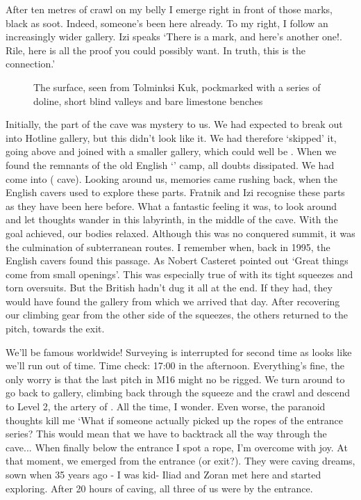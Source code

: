 After ten metres of crawl on my belly I emerge right in front of those marks, black as soot. Indeed, someone's been here already. To my right, I follow an increasingly wider gallery. Izi speaks `There is a mark, and here's another one!. Rile, here is all the proof you could possibly want. In truth, this is the connection.'


 \begin{figure}[t!]
\checkoddpage \ifoddpage \forcerectofloat \else \forceversofloat \fi
\centering
{}
\caption{The \protect{} surface, seen from Tolminksi Kuk, pockmarked with a series of doline, short blind valleys and bare limestone benches }
\label{mig seen from kuk}
\end{figure}


 Initially, the part of the cave was mystery to us. We had expected to break out into Hotline gallery, but this didn't look like it. We had therefore `skipped' it, going above and joined with a smaller gallery, which could well be . When we found the remnants of the old English `' camp, all doubts dissipated. We had come into  ( cave). Looking around us, memories came rushing back, when the English cavers used to explore these parts. Fratnik and Izi recognise these parts as they have been here before. What a fantastic feeling it was, to look around and let thoughts wander in this labyrinth, in the middle of the cave. With the goal achieved, our bodies relaxed. Although this was no conquered summit, it was the culmination of subterranean routes. I remember when, back in 1995, the English cavers found this passage. As Nobert Casteret pointed out `Great things come from small openings'. This was especially true of with its tight squeezes and torn oversuits. But the British hadn't dug it all at the end. If they had, they would have found the gallery from which we arrived that day. After recovering our climbing gear from the other side of the squeezes, the others returned to the pitch, towards the exit.

 We'll be famous worldwide! Surveying is interrupted for second time as looks like we'll run out of time. Time check: 17:00 in the afternoon. Everything's fine, the only worry is that the last pitch in M16 might no be rigged. We turn around to go back to  gallery, climbing back through the squeeze and the crawl and descend to Level 2, the artery of .  All the time, I wonder. Even worse, the paranoid thoughts kill me `What if someone actually picked up the ropes of the entrance series? This would mean that we have to backtrack all the way through the cave... When finally below the entrance I spot a rope, I'm overcome with joy. At that moment, we emerged from the entrance (or exit?). They were caving dreams, sown when 35 years ago - I was kid- Iliad and Zoran met here and started exploring. After 20 hours of caving, all three of us were by the entrance.
 
